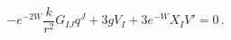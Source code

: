 \begin{equation}
- e^{-2W} \frac{k}{r^2}G_{IJ} q^J + 3g V_I + 3 e^{-W} X_I V' = 0\,. \label{flowfix}
\end{equation}

